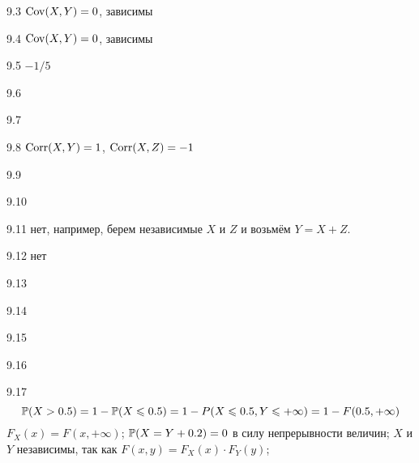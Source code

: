 \protect \hypertarget {soln:9.3}{}
\begin{solution}{{9.3}}
      $\Cov(X,Y)=0$, зависимы
\end{solution}
\protect \hypertarget {soln:9.4}{}
\begin{solution}{{9.4}}
  $\Cov(X,Y)=0$, зависимы
\end{solution}
\protect \hypertarget {soln:9.5}{}
\begin{solution}{{9.5}}
  $-1/5$
\end{solution}
\protect \hypertarget {soln:9.6}{}
\begin{solution}{{9.6}}
\end{solution}
\protect \hypertarget {soln:9.7}{}
\begin{solution}{{9.7}}
\end{solution}
\protect \hypertarget {soln:9.8}{}
\begin{solution}{{9.8}}
$\Corr(X,Y)=1$, $\Corr(X,Z)=-1$
\end{solution}
\protect \hypertarget {soln:9.9}{}
\begin{solution}{{9.9}}
\end{solution}
\protect \hypertarget {soln:9.10}{}
\begin{solution}{{9.10}}
\end{solution}
\protect \hypertarget {soln:9.11}{}
\begin{solution}{{9.11}}
  нет, например, берем независимые $X$ и $Z$ и возьмём $Y=X+Z$.
\end{solution}
\protect \hypertarget {soln:9.12}{}
\begin{solution}{{9.12}}
нет
\end{solution}
\protect \hypertarget {soln:9.13}{}
\begin{solution}{{9.13}}
\end{solution}
\protect \hypertarget {soln:9.14}{}
\begin{solution}{{9.14}}
\end{solution}
\protect \hypertarget {soln:9.15}{}
\begin{solution}{{9.15}}
\end{solution}
\protect \hypertarget {soln:9.16}{}
\begin{solution}{{9.16}}
\end{solution}
\protect \hypertarget {soln:9.17}{}
\begin{solution}{{9.17}}
  \[
  \P(X>0.5) = 1 - \P(X\leq 0.5) = 1 - P(X\leq 0.5, Y\leq +\infty) = 1 - F(0.5, +\infty)
  \]
  $F_X(x)=F(x, +\infty)$; $\P(X=Y+0.2)=0$ в силу непрерывности величин; $X$ и $Y$ независимы, так как $F(x,y)=F_X(x)\cdot F_Y(y)$;
\end{solution}
